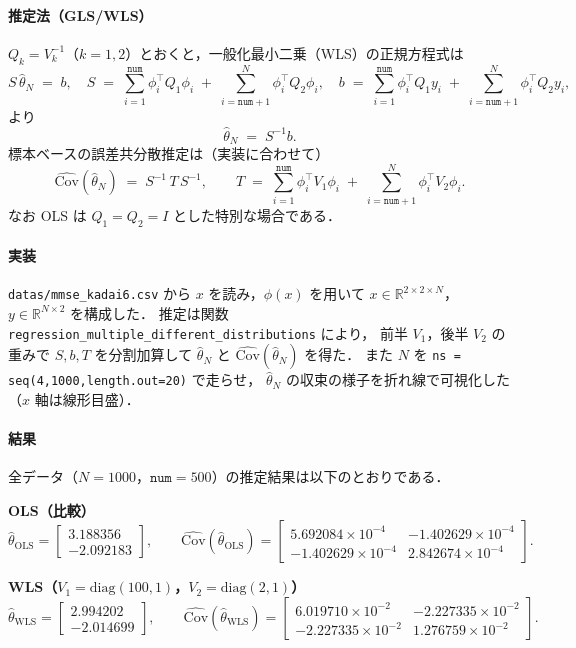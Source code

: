 \paragraph{推定法（GLS/WLS）}
$Q_k=V_k^{-1}$（$k=1,2$）とおくと，一般化最小二乗（WLS）の正規方程式は
\[
  S\,\hat{\theta}_N \;=\; b,
  \quad
  S \;=\; \sum_{i=1}^{\texttt{num}}\!\phi_i^\top Q_1\phi_i \;+\; \sum_{i=\texttt{num}+1}^{N}\!\phi_i^\top Q_2\phi_i,
  \quad
  b \;=\; \sum_{i=1}^{\texttt{num}}\!\phi_i^\top Q_1 y_i \;+\; \sum_{i=\texttt{num}+1}^{N}\!\phi_i^\top Q_2 y_i,
\]
より
\[
  \hat{\theta}_N \;=\; S^{-1} b.
\]
標本ベースの誤差共分散推定は（実装に合わせて）
\[
  \widehat{\mathrm{Cov}}(\hat{\theta}_N)
  \;=\;
  S^{-1}\,T\,S^{-1},\qquad
  T \;=\; \sum_{i=1}^{\texttt{num}}\!\phi_i^\top V_1\phi_i \;+\; \sum_{i=\texttt{num}+1}^{N}\!\phi_i^\top V_2\phi_i .
\]
なお OLS は $Q_1=Q_2=I$ とした特別な場合である．

\paragraph{実装}
\texttt{datas/mmse\_kadai6.csv} から $x$ を読み，$\phi(x)$ を用いて
$x\in\mathbb{R}^{2\times2\times N}$，$y\in\mathbb{R}^{N\times2}$ を構成した．
推定は関数 \texttt{regression\_multiple\_different\_distributions} により，
前半 $V_1$，後半 $V_2$ の重みで $S,b,T$ を分割加算して $\hat{\theta}_N$ と
$\widehat{\mathrm{Cov}}(\hat{\theta}_N)$ を得た．
また $N$ を \texttt{ns = seq(4,1000,length.out=20)} で走らせ，
$\hat{\theta}_N$ の収束の様子を折れ線で可視化した（$x$ 軸は線形目盛）．

\paragraph{結果}
全データ（$N=1000$，$\texttt{num}=500$）の推定結果は以下のとおりである．

\medskip
\noindent\textbf{OLS（比較）}
\[
  \hat{\theta}_{\mathrm{OLS}}=
  \begin{bmatrix}
    3.188356\\[-1mm]
   -2.092183
  \end{bmatrix},\qquad
  \widehat{\mathrm{Cov}}(\hat{\theta}_{\mathrm{OLS}})=
  \begin{bmatrix}
    5.692084\!\times\!10^{-4} & -1.402629\!\times\!10^{-4}\\
    -1.402629\!\times\!10^{-4} & 2.842674\!\times\!10^{-4}
  \end{bmatrix}.
\]

\noindent\textbf{WLS（$V_1=\mathrm{diag}(100,1)$，$V_2=\mathrm{diag}(2,1)$）}
\[
  \hat{\theta}_{\mathrm{WLS}}=
  \begin{bmatrix}
    2.994202\\[-1mm]
   -2.014699
  \end{bmatrix},\qquad
  \widehat{\mathrm{Cov}}(\hat{\theta}_{\mathrm{WLS}})=
  \begin{bmatrix}
    6.019710\!\times\!10^{-2} & -2.227335\!\times\!10^{-2}\\
    -2.227335\!\times\!10^{-2} & 1.276759\!\times\!10^{-2}
  \end{bmatrix}.
\]

